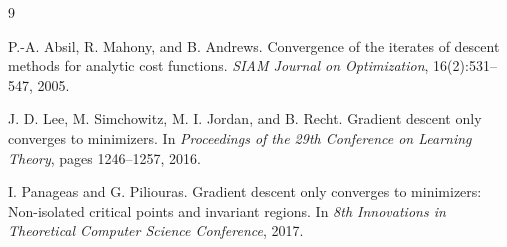 \documentclass[11pt]{article}
\begin{document}
\begin{thebibliography}{9}

P.-A. Absil, R. Mahony, and B. Andrews.
\newblock Convergence of the iterates of descent methods for analytic cost
functions.
\newblock \emph{SIAM Journal on Optimization}, 16(2):531--547, 2005.

J. D. Lee, M. Simchowitz, M. I. Jordan, and B. Recht.
\newblock Gradient descent only converges to minimizers.
\newblock In \emph{Proceedings of the 29th Conference on Learning Theory},
pages 1246--1257, 2016.

I. Panageas and G. Piliouras.
\newblock Gradient descent only converges to minimizers: Non-isolated critical
points and invariant regions.
\newblock In \emph{8th Innovations in Theoretical Computer Science Conference},
2017.

\end{thebibliography}
\end{document}
